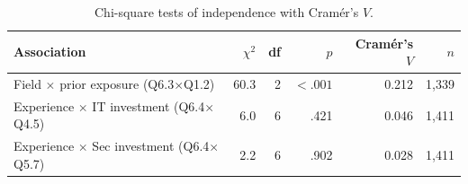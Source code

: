 \begin{table}[ht]
\centering
\caption{Chi-square tests of independence with Cram\'er's $V$.}
\label{tab:assoc}
\small
\begin{tabular}{lrrrrr}
\toprule
Association & $\chi^2$ & df & $p$ & Cram\'er's $V$ & $n$ \\
\midrule
Field $\times$ prior exposure (Q6.3$\times$Q1.2) & 60.3 & 2 & $<.001$ & 0.212 & 1{,}339 \\
Experience $\times$ IT investment (Q6.4$\times$Q4.5) & 6.0 & 6 & .421 & 0.046 & 1{,}411 \\
Experience $\times$ Sec investment (Q6.4$\times$Q5.7) & 2.2 & 6 & .902 & 0.028 & 1{,}411 \\
\bottomrule
\end{tabular}
\end{table}
